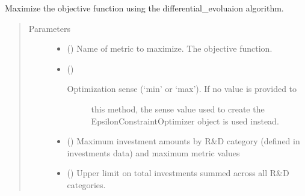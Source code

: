 \documentclass[letterpaper,10pt,english]{sphinxmanual}
\begin{document}
\begin{fulllineitems}
\begin{fulllineitems}
\begin{quote}
\begin{description}
\end{description}\end{quote}

\end{fulllineitems}


\begin{fulllineitems}
\label{\detokenize{tyche:tyche.EpsilonConstraints.EpsilonConstraintOptimizer.opt_diffev}}
Maximize the objective function using the differential\_evoluaion algorithm.
\begin{quote}\begin{description}
\item[{Parameters}] \leavevmode\begin{itemize}
\item {} 
 () \textendash{} Name of metric to maximize. The objective function.

\item {} 
 () \textendash{} \begin{description}
\item[{Optimization sense (‘min’ or ‘max’). If no value is provided to}] \leavevmode
this method, the sense value used to create the
EpsilonConstraintOptimizer object is used instead.

\end{description}


\item {} 
 () \textendash{} Maximum investment amounts by R\&D category (defined in investments data)
and maximum metric values

\item {} 
 () \textendash{} Upper limit on total investments summed across all R\&D categories.


\end{itemize}
\end{description}
\end{quote}
\end{fulllineitems}
\end{fulllineitems}
\end{document}
